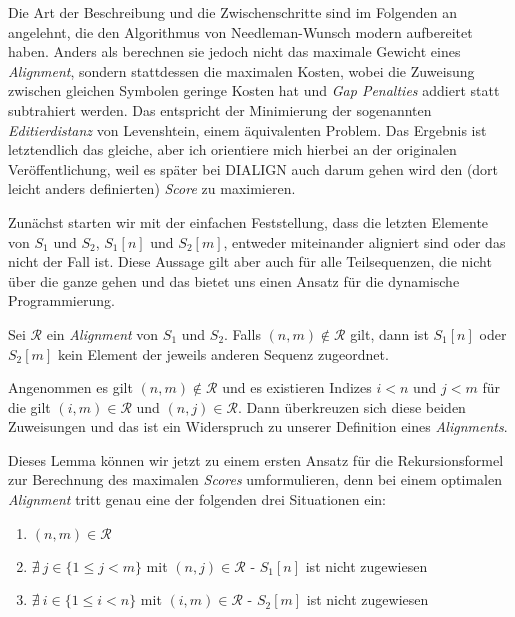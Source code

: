 Die Art der Beschreibung und die Zwischenschritte  sind im Folgenden an \cite{kt05} angelehnt, die den Algorithmus von Needleman-Wunsch modern aufbereitet haben. Anders als \cite{nw70} berechnen sie jedoch nicht das maximale Gewicht eines \emph{Alignment}, sondern stattdessen die maximalen Kosten, wobei die Zuweisung zwischen gleichen Symbolen geringe Kosten hat und \emph{Gap Penalties} addiert statt subtrahiert werden. Das entspricht der Minimierung der sogenannten \emph{Editierdistanz} von Levenshtein, einem äquivalenten Problem. Das Ergebnis ist letztendlich das gleiche, aber ich orientiere mich hierbei an der originalen Veröffentlichung, weil es später bei DIALIGN auch darum gehen wird den (dort leicht anders definierten) \emph{Score} zu maximieren.

Zunächst starten wir mit der einfachen Feststellung, dass die letzten Elemente von $S_1$ und $S_2$, $S_1[n]$ und $S_2[m]$, entweder miteinander aligniert sind oder das nicht der Fall ist. Diese Aussage gilt aber auch für alle Teilsequenzen, die nicht über die ganze gehen und das bietet uns einen Ansatz für die dynamische Programmierung. 

\begin{lemma}
	Sei $\mathcal{R}$ ein \emph{Alignment} von $S_1$ und $S_2$. Falls $(n,m) \notin \mathcal{R}$ gilt, dann ist $S_1[n]$ oder $S_2[m]$ kein Element der jeweils anderen Sequenz zugeordnet. 
\end{lemma}

\begin{beweis}
	Angenommen es gilt $(n,m) \notin \mathcal{R}$ und es existieren Indizes $i < n$ und $j < m$ für die gilt $(i,m) \in \mathcal{R}$ und $(n,j) \in \mathcal{R}$. Dann überkreuzen sich diese beiden Zuweisungen und das ist ein Widerspruch zu unserer Definition eines  \emph{Alignments}.
\end{beweis}

Dieses Lemma können wir jetzt zu einem ersten Ansatz für die Rekursionsformel zur Berechnung des maximalen \emph{Scores} umformulieren, denn bei einem optimalen \emph{Alignment} tritt genau eine der folgenden drei Situationen ein:

\begin{enumerate}[topsep=0pt,itemsep=-1ex,partopsep=1ex,parsep=1ex]
	\item $(n,m) \in \mathcal{R}$
	\item $\nexists\: j \in \{1 \leq j < m\}$ mit $(n,j) \in \mathcal{R}$ - $S_1[n]$ ist nicht zugewiesen
	\item $\nexists\: i \in \{1 \leq i < n\}$ mit $(i,m) \in \mathcal{R}$ - $S_2[m]$ ist nicht zugewiesen
\end{enumerate}

